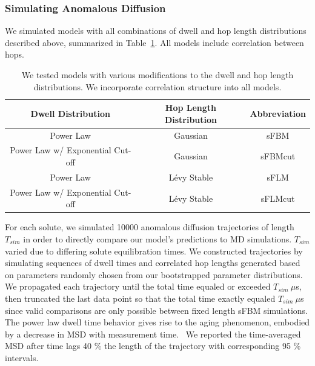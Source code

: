 \documentclass{article}
\begin{document}
  \subsubsection*{Simulating Anomalous Diffusion}

  We simulated models with all combinations of dwell and hop length distributions
  described above, summarized in Table~\ref{table:anomalous_models}. All models 
  include correlation between hops.
  \begin{table}[!htb]
	  \centering
	  \begin{tabular}{|c|c|c|}
	  \hline
	  Dwell Distribution                & Hop Length Distribution & Abbreviation \\
	  \hline
      Power Law                         & Gaussian                & sFBM         \\
      Power Law w/ Exponential Cut-off  & Gaussian                & sFBMcut      \\
      Power Law                         & L\'evy Stable           & sFLM         \\
      Power Law w/ Exponential Cut-off  & L\'evy Stable           & sFLMcut      \\
	  \hline
	  \end{tabular}
	  \caption{We tested models with various modifications to the dwell and hop
	  length distributions. We incorporate correlation structure into all models.}\label{table:anomalous_models}
 \end{table}

  For each solute, we simulated 10000 anomalous diffusion trajectories of length $T_{sim}$ in
  order to directly compare our model's predictions to MD simulations. $T_{sim}$ varied due to
  differing solute equilibration times. We constructed trajectories by simulating 
  sequences of dwell times and correlated hop lengths generated based on
  parameters randomly chosen from our bootstrapped parameter distributions. We 
  propagated each trajectory until the total time equaled or exceeded $T_{sim}~ \mu$s, then
  truncated the last data point so that the total time exactly equaled $T_{sim}~ \mu$s since
  valid comparisons are only possible between fixed length sFBM simulations. The
  power law dwell time behavior gives rise to the aging phenomenon, embodied by a 
  decrease in MSD with measurement time.~\cite{neusius_subdiffusion_2008,metzler_anomalous_2014}
  We reported the time-averaged MSD after time lags 40 \% the length of the trajectory
  with corresponding 95 \% intervals.
  
\end{document}
